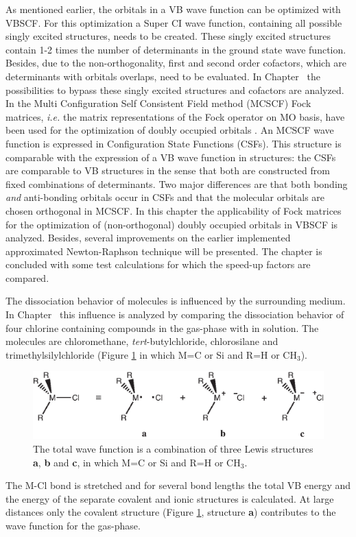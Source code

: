 As mentioned earlier, the orbitals in a VB wave function can be optimized with VBSCF. For this optimization a Super CI wave function, containing all possible singly excited structures,  needs to be created. These singly excited structures contain 1-2 times the number of determinants in the ground state wave function. Besides, due to the non-orthogonality, first and second order cofactors, which are determinants with orbitals overlaps, need to be evaluated. In Chapter \chorbopt\ the possibilities to bypass these singly excited structures and cofactors are analyzed. In the Multi Configuration Self Consistent Field method (MCSCF) \cite{wahldasbook,daswahl} Fock matrices, \textit{i.e.} the matrix representations of the Fock operator on MO basis, have been used for the optimization of doubly occupied orbitals \cite{roos1,roos2}. An MCSCF wave function is expressed in Configuration State Functions (CSFs). This structure is comparable with the expression of a VB wave function in structures: the CSFs are comparable to VB structures in the sense that both are constructed from fixed combinations of determinants. Two major differences are that both bonding \textit{and} anti-bonding orbitals occur in CSFs and that the molecular orbitals are chosen orthogonal in MCSCF. In this chapter the applicability of Fock matrices for the optimization of (non-orthogonal) doubly occupied orbitals in VBSCF is analyzed. Besides, several improvements on the earlier implemented approximated Newton-Raphson technique \cite{koos1} will be presented. The chapter is concluded with some test calculations for which the speed-up factors are compared.

The dissociation behavior of molecules is influenced by the surrounding medium. In Chapter \chdissociation\ this influence is analyzed by comparing the dissociation behavior of four chlorine containing compounds in the gas-phase with in solution. The molecules are chloromethane, \textit{tert}-butylchloride, chlorosilane and trimethylsilylchloride (Figure \ref{ch1.fig.structures1} in which M=C or Si and R=H or CH$_3$).
\begin{figure}[htbp]
\center
\includegraphics{introduction/figures/structures.eps}
\caption{The total wave function is a combination of three Lewis structures \textbf{a}, \textbf{b} and \textbf{c}, in which M=C or Si and R=H or CH$_3$.}
\label{ch1.fig.structures1}
\end{figure}
The M-Cl bond  is stretched and for several bond lengths the total VB energy and the energy of the separate covalent and ionic structures is calculated. At large distances only the covalent structure (Figure \ref{ch1.fig.structures1}, structure \textbf{a}) contributes to the wave function for the gas-phase. 

